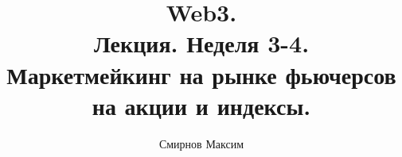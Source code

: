 \documentclass{article}
\title{Web3.\\
Лекция. Неделя 3-4. \\
Маркетмейкинг на рынке фьючерсов на акции и индексы.}
\author{Смирнов Максим}
\begin{document}
\maketitle

\setcounter{tocdepth}{1} %
\renewcommand\contentsname{Contents}
\tableofcontents
\newpage




\renewcommand{\labelitemi}{\tiny$\bullet$}
\renewcommand{\figurename}{Fig.}

\newpage
\end{document}
